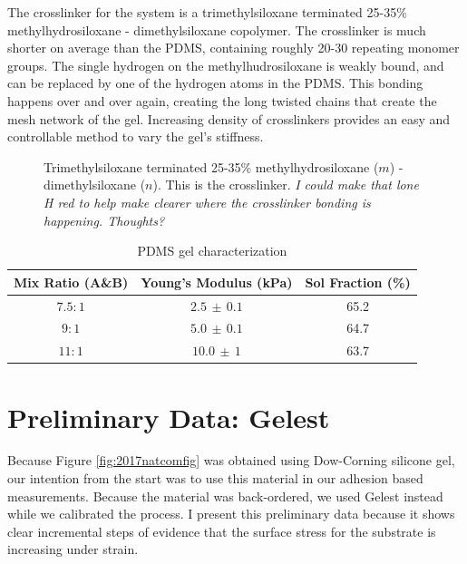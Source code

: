 The crosslinker for the system is a trimethylsiloxane terminated 25-35\% methylhydrosiloxane - dimethylsiloxane copolymer. The crosslinker is much shorter on average than the PDMS, containing roughly 20-30 repeating monomer groups. The single hydrogen on the methylhudrosiloxane is weakly bound, and can be replaced by one of the hydrogen atoms in the PDMS. This bonding happens over and over again, creating the long twisted chains that create the mesh network of the gel. Increasing density of crosslinkers provides an easy and controllable method to vary the gel's stiffness.

\begin{figure}
	\centering
	\label{fig:HMS-301}
	\caption[HMS-301]{Trimethylsiloxane terminated 25-35\% methylhydrosiloxane ($m$) - dimethylsiloxane ($n$). This is the crosslinker. \emph{I could make that lone H red to help make clearer where the crosslinker bonding is happening. Thoughts?}}
\end{figure}

\begin{table}[h!]
	\caption[PDMS ratios Characterization]{PDMS gel characterization}
	\begin{center}
		\begin{tabular}{|c||c||c|}
			\hline
			Mix Ratio (A\&B) & Young's Modulus (kPa) & Sol Fraction (\%)\\
			\hline
			$7.5:1$ & $2.5 \,\pm\, 0.1$ & 65.2\\
			\hline
			$9:1$ & $5.0 \, \pm\, 0.1$  & 64.7\\
			\hline
			$11:1$ & $10.0 \,\pm\, 1$  & 63.7\\
			\hline
		\end{tabular}
	\end{center}
	\label{tab:recipes}
\end{table}


\section{Preliminary Data: Gelest}
Because Figure \ref{fig:2017natcomfig} was obtained using Dow-Corning silicone gel, our intention from the start was to use this material in our adhesion based measurements. Because the material was back-ordered, we used Gelest instead while we calibrated the process. I present this preliminary data because it shows clear incremental steps of evidence that the surface stress for the substrate is increasing under strain.  

